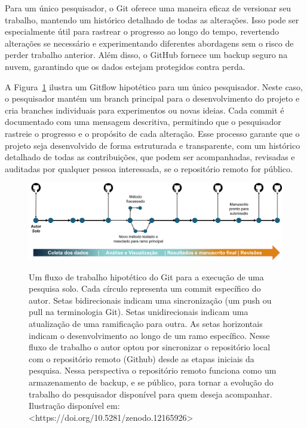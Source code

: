 \documentclass[
  a4paper,
]{article}
\begin{document}
Para um único pesquisador, o Git oferece uma maneira eficaz de versionar
seu trabalho, mantendo um histórico detalhado de todas as alterações.
Isso pode ser especialmente útil para rastrear o progresso ao longo do
tempo, revertendo alterações se necessário e experimentando diferentes
abordagens sem o risco de perder trabalho anterior. Além disso, o GitHub
fornece um backup seguro na nuvem, garantindo que os dados estejam
protegidos contra perda.

A Figura~\ref{fig-gitautorbegin} ilustra um Gitflow hipotético para um
único pesquisador. Neste caso, o pesquisador mantém um branch principal
para o desenvolvimento do projeto e cria branches individuais para
experimentos ou novas ideias. Cada commit é documentado com uma mensagem
descritiva, permitindo que o pesquisador rastreie o progresso e o
propósito de cada alteração. Esse processo garante que o projeto seja
desenvolvido de forma estruturada e transparente, com um histórico
detalhado de todas as contribuições, que podem ser acompanhadas,
revisadas e auditadas por qualquer pessoa interessada, se o repositório
remoto for público.

\begin{figure}

\href{https://doi.org/10.5281/zenodo.12165926}{\includegraphics{img/gitautorbegin.jpg}}

\caption{\label{fig-gitautorbegin}Um fluxo de trabalho hipotético do Git
para a execução de uma pesquisa solo. Cada círculo representa um commit
específico do autor. Setas bidirecionais indicam uma sincronização (um
push ou pull na terminologia Git). Setas unidirecionais indicam uma
atualização de uma ramificação para outra. As setas horizontais indicam
o desenvolvimento ao longo de um ramo específico. Nesse fluxo de
trabalho o autor optou por sincronizar o repositório local com o
repositório remoto (Github) desde as etapas iniciais da pesquisa. Nessa
perspectiva o repositório remoto funciona como um armazenamento de
backup, e se público, para tornar a evolução do trabalho do pesquisador
disponível para quem deseja acompanhar. Ilustração disponível em:
\textless https://doi.org/10.5281/zenodo.12165926\textgreater{}}

\end{figure}%
\end{document}
